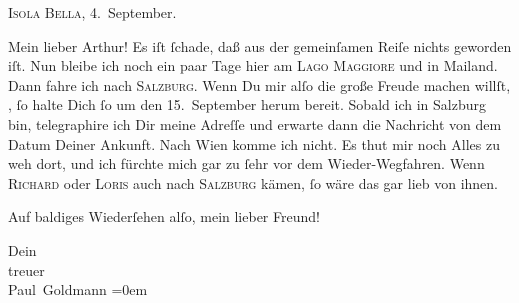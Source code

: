 \pstart
           \centering{}\textsc{Isola Bella}, 4. September. \pend
           
\pstart\center{}Mein lieber Arthur!\pend\vspace{0.5em}
\pstart
           Es iſt ſchade, daß aus der gemeinſamen Reiſe nichts geworden iſt. Nun bleibe ich noch
               ein paar Tage hier am \textsc{Lago Maggiore} und in Mailand. Dann fahre ich nach \textsc{Salzburg}. Wenn Du mir alſo die große Freude machen willſt, \label{K_L02714-1v}\label{K_L02714-1}, ſo halte Dich ſo um den 15. September herum
               bereit. {\pb}Sobald ich in Salzburg bin, telegraphire ich Dir meine Adreſſe und \strikeout{\textcolor{gray}{×}} erwarte dann die Nachricht von dem Datum Deiner Ankunft. Nach Wien komme ich nicht. Es thut mir noch Alles zu weh dort, und
               ich fürchte mich gar zu ſehr vor dem Wieder-Wegfahren. Wenn \textsc{Richard} oder \textsc{Loris} auch nach \textsc{Salzburg} kämen, ſo wäre das gar lieb von ihnen.\pend
           
\pstart
           Auf baldiges Wiederſehen alſo, mein lieber Freund!\pend
           
\pstart
           Dein {\\[\baselineskip]}treuer {\\[\baselineskip]}\spacefill\mbox{Paul Goldmann}\pend
           \leftskip=0em{}\endnumbering{}  
      